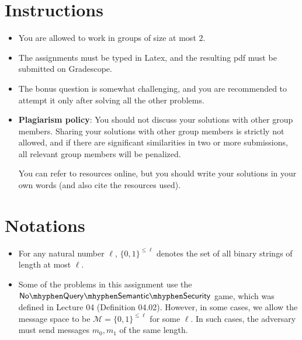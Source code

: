 \documentclass[10pt,addpoints]{exam}
\newcommand{\calM}{\mathcal{M}}
\newcommand{\noqss}{\mathsf{No\mhyphen Query \mhyphen Semantic \mhyphen Security}}
\begin{document}
\vspace{0.4cm}

\section*{Instructions}

\begin{itemize}
    \item You are allowed to work in groups of size at most $2$. 

    \item The assignments must be typed in Latex, and the resulting pdf must be submitted on Gradescope. 
    
    \item The bonus question is  somewhat challenging, and you are recommended to attempt it only after solving all the other problems. 
    
    \item \textbf{Plagiarism policy}: You should not discuss your solutions with other group members. Sharing your solutions with other group members is strictly not allowed, and if there are significant similarities in two or more submissions, all relevant group members will be penalized. 
    
    You can refer to resources online, but you should write your solutions in your own words (and also cite the resources used). 
\end{itemize}


\section*{Notations}

\begin{itemize}
    \item For any natural number $\ell$, $\{0,1\}^{\leq \ell}$ denotes the set of all binary strings of length at most $\ell$. 

    \item Some of the problems in this assignment use the $\noqss$ game, which was defined in Lecture 04 (Definition 04.02). However, in some cases, we allow the message space to be $\calM = \{0,1\}^{\leq \ell}$ for some $\ell$. In such cases, the adversary must send messages $m_0, m_1$ of the same length. 
\end{itemize}
\end{document}
